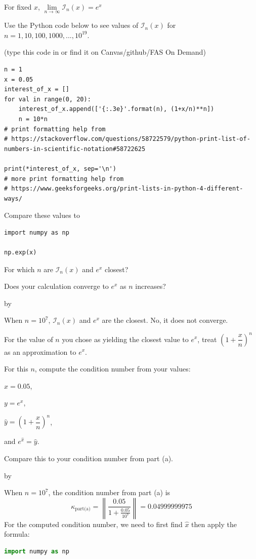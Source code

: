\documentclass[12pt,letterpaper,answers]{exam}
\makeatletter
\def\SetTotalwidth{\advance\linewidth by \@totalleftmargin
\@totalleftmargin=0pt}
\makeatother
\begin{document}
\begin{questions}
\begin{parts}
\item For fixed $x$, $\lim\limits_{n\rightarrow\infty}\mathcal{I}_n(x) = e^x$

Use the Python code below to see values of $\mathcal{I}_n(x)$ for $n=1,10,100,1000,...,10^{19}$.

(type this code in or find it on Canvas/github/FAS On Demand)

\begin{verbatim}
n = 1
x = 0.05
interest_of_x = []
for val in range(0, 20):
    interest_of_x.append(['{:.3e}'.format(n), (1+x/n)**n])
    n = 10*n
# print formatting help from
# https://stackoverflow.com/questions/58722579/python-print-list-of-numbers-in-scientific-notation#58722625

print(*interest_of_x, sep='\n')
# more print formatting help from
# https://www.geeksforgeeks.org/print-lists-in-python-4-different-ways/
\end{verbatim}
\vspace{0.1in}

Compare these values to
\begin{verbatim}
import numpy as np

np.exp(x)
\end{verbatim}

For which $n$ are $\mathcal{I}_n(x)$ and $e^x$ closest?

Does your calculation converge to $e^x$ as $n$ increases?

\SetTotalwidth
\begin{solution}
When $n=10^7$, $\mathcal{I}_n(x)$ and $e^x$ are the closest. No, it does not converge.
\end{solution}

\item For the value of $n$ you chose as yielding the closest value to $e^x$, treat $\left(1+\dfrac{x}{n}\right)^n$ as an approximation to $e^x$.  

For this $n$, compute the condition number from your values: 

$x = 0.05$, 

$y = e^x$, 

$\hat{y} = \left(1+\dfrac{x}{n}\right)^n$, 

and $e^{\hat{x}}=\hat{y}$.  

Compare this to your condition number from part (a).
 
\SetTotalwidth
\begin{solution}
When $n=10^7$, the condition number from part (a) is
$$\kappa_\text{part(a)}= \left\lVert \frac{0.05}{1+\frac{0.05}{10^7}} \right\rVert = 0.04999999975$$
For the computed condition number, we need to first find $\hat{x}$ then apply the formula:
\begin{lstlisting}[language=Python]
import numpy as np
    

\end{lstlisting}
\end{solution}
\end{parts}
\end{questions}
\end{document}
